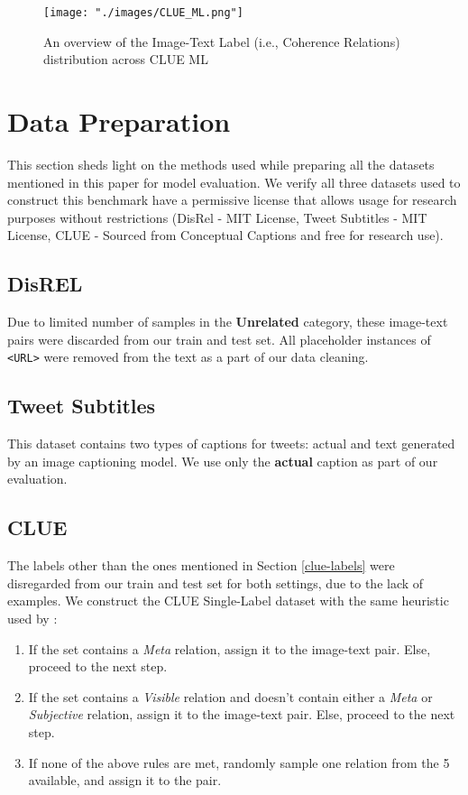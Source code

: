 \begin{figure}
    \centering
    \texttt{[image: "./images/CLUE\_ML.png"]}
    \caption{An overview of the Image-Text Label (i.e., Coherence Relations) distribution across CLUE ML}
    \label{fig:multilabel-distribution}
\end{figure}

\section{Data Preparation}
\label{appendix-data-prep}

This section sheds light on the methods used while preparing all the datasets mentioned in this paper for model evaluation. We verify all three datasets used to construct this benchmark have a permissive license that allows usage for research purposes without restrictions (DisRel - MIT License, Tweet Subtitles - MIT License, CLUE - Sourced from Conceptual Captions and free for research use).

\subsection{DisREL}
Due to limited number of samples in the \textbf{Unrelated} category, these image-text pairs were discarded from our train and test set. All placeholder instances of \texttt{<URL>} were removed from the text as a part of our data cleaning.

\subsection{Tweet Subtitles}
This dataset contains two types of captions for tweets: actual and text generated by an image captioning model. We use only the \textbf{actual} caption as part of our evaluation.

\subsection{CLUE}
The labels other than the ones mentioned in Section \ref{clue-labels} were disregarded from our train and test set for both settings, due to the lack of examples. We construct the CLUE Single-Label dataset with the same heuristic used by \citet{Alikhani2020-nr}:

\begin{enumerate}[leftmargin=1.25cm, label=Step \arabic*:]
    \item If the set contains a \textit{Meta} relation, assign it to the image-text pair. Else, proceed to the next step.
    \item If the set contains a \textit{Visible} relation and doesn't contain either a \textit{Meta} or \textit{Subjective} relation, assign it to the image-text pair. Else, proceed to the next step.
    \item If none of the above rules are met, randomly sample one relation from the 5 available, and assign it to the pair.
\end{enumerate}

